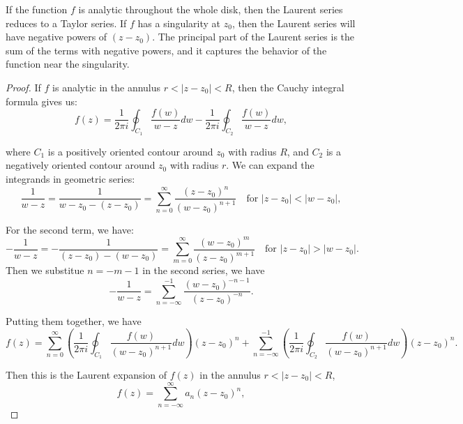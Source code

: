 \documentclass{article}
\begin{document}
If the function $f$ is analytic throughout the whole disk, then the Laurent series reduces to a Taylor series. If $f$ has a singularity at $z_0$, then the Laurent series will have negative powers of $(z-z_0)$. The principal part of the Laurent series is the sum of the terms with negative powers, and it captures the behavior of the function near the singularity.
\begin{proof}
    If $f$ is analytic in the annulus $ r < |z-z_0|<R$, then the Cauchy integral formula gives us:
    \begin{equation}
        f(z) = \frac{1}{2\pi i}\oint_{C_1} \frac{f(w)}{w-z} dw - \frac{1}{2\pi i}\oint_{C_2} \frac{f(w)}{w-z} dw,
    \end{equation}

    where $C_1$ is a positively oriented contour around $z_0$ with radius $R$, and $C_2$ is a negatively oriented contour around $z_0$ with radius $r$. We can expand the integrands in geometric series:
    \begin{equation}
        \frac{1}{w-z} = \frac{1}{w-z_0 - (z-z_0)} = \sum_{n=0}^{\infty} \frac{(z-z_0)^n}{(w-z_0)^{n+1}} \quad \text{for } |z-z_0| < |w-z_0|,
    \end{equation}

    For the second term, we have:
    \begin{equation}
        -\frac{1}{w-z} = -\frac{1}{(z-z_0) - (w-z_0)} = \sum_{m=0}^{\infty} \frac{(w-z_0)^{m}}{(z-z_0)^{m+1}} \quad \text{for } |z-z_0| > |w-z_0|.
    \end{equation}
    Then we substitue $n = -m-1$ in the second series, we have
    \begin{equation}
        -\frac{1}{w-z} = \sum_{n=-\infty}^{-1} \frac{(w-z_0)^{-n-1}}{(z-z_0)^{-n}}.
    \end{equation}

    Putting them together, we have
    \begin{equation}
        f(z) = \sum_{n=0}^{\infty} \left( \frac{1}{2\pi i} \oint_{C_1} \frac{f(w)}{(w-z_0)^{n+1}} dw \right) (z-z_0)^n + \sum_{n=-\infty}^{-1} \left( \frac{1}{2\pi i} \oint_{C_2} \frac{f(w)}{(w-z_0)^{n+1}} dw \right) (z-z_0)^n.
    \end{equation}

    Then this is the Laurent expansion of $f(z)$ in the annulus $r < |z-z_0| < R$,
    \begin{equation}
        f(z) = \sum_{n=-\infty}^{\infty} a_n (z - z_0)^n,
    \end{equation}
\end{proof}
\end{document}
